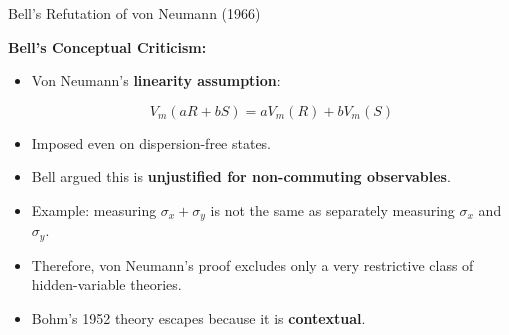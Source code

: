 \begin{frame}{Bell’s Refutation of von Neumann (1966)}

\begin{minipage}{0.65\textwidth}
\textbf{Bell’s Conceptual Criticism:}
\begin{itemize}
  \item Von Neumann’s \textbf{linearity assumption}:
   \vspace{-0.4cm}

  \[
    V_m(aR+bS) = aV_m(R) + bV_m(S)
  \]

  \vspace{-0.3cm}
  \pause
  \item Imposed even on dispersion-free states.
  \pause
  \item Bell argued this is \textbf{unjustified for non-commuting observables}.
  \pause
  \item Example: measuring $\sigma_x + \sigma_y$ is not the same as separately measuring $\sigma_x$ and $\sigma_y$.
  \pause
  \item Therefore, von Neumann’s proof excludes only a very restrictive class of hidden-variable theories.
  \pause
  \item Bohm’s 1952 theory escapes because it is \textbf{contextual}.
\end{itemize}
\end{minipage}
\hfill
\begin{minipage}{0.33\textwidth}
  \centering


\end{minipage}
\end{frame}
